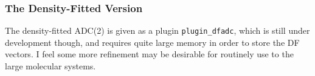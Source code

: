 \subsubsection{The Density-Fitted Version}
The density-fitted ADC(2) is given as a plugin \verb|plugin_dfadc|, which is still under development though, and requires quite large memory in order to store the DF vectors. I feel some more refinement may be desirable for routinely use to the large molecular systems.